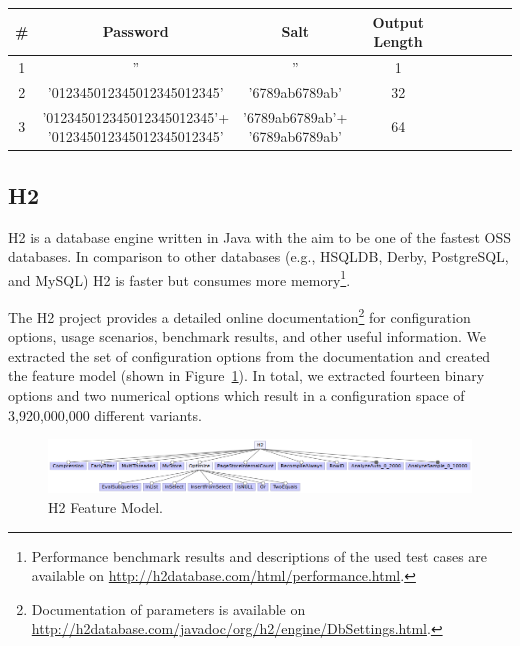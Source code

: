 \begin{table}[h]

	\centering %
    \begin{tabular}{*{9}{c}}
    	\toprule
        \# &Password & Salt & Output Length \\
        \midrule
        1 & '' & '' & 1 \\
        \midrule
        2 & '012345012345012345012345' & '6789ab6789ab' & 32 \\
        \midrule
        3 & \makecell{'012345012345012345012345'+ \\ '012345012345012345012345'} & \makecell{'6789ab6789ab'+ \\ '6789ab6789ab'} & 64 \\
        \bottomrule
    \end{tabular}
    \label{wl_catena}
\end{table}


\subsection{H2}

H2 is a database engine written in Java with the aim to be one of the fastest \ac{OSS} databases. In comparison to other databases (e.g., HSQLDB, Derby, PostgreSQL, and MySQL) H2 is faster but consumes more memory\footnote{Performance benchmark results and descriptions of the used test cases are available on \url{http://h2database.com/html/performance.html}.}.

The H2 project provides a detailed online documentation\footnote{Documentation of parameters is available on \url{http://h2database.com/javadoc/org/h2/engine/DbSettings.html}.} for configuration options, usage scenarios, benchmark results, and other useful information. We extracted the set of configuration options from the documentation and created the feature model (shown in Figure~\ref{fm_h2}). In total, we extracted fourteen binary options and two numerical options which result in a configuration space of 3,920,000,000 different variants. 


\begin{figure}[h]
  \centering
  \includegraphics[width=\textwidth]{images/H2_Feature_model}
  \caption{H2 Feature Model.}
  \label{fm_h2}
\end{figure}


